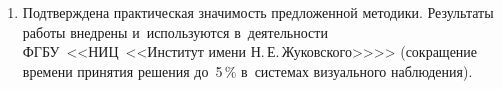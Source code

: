 \begin{enumerate}
  \item Подтверждена практическая значимость предложенной методики.
        Результаты работы внедрены и~используются в~деятельности
        ФГБУ~<<НИЦ~<<Институт имени Н.\,Е.\,Жуковского>>>>
        (сокращение времени принятия решения до~5\,\% в~системах
        визуального наблюдения).
\end{enumerate}

